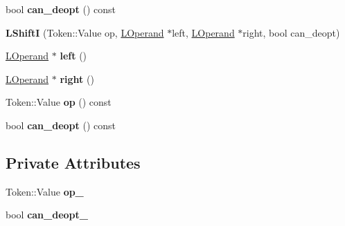 \begin{DoxyCompactItemize}
\item 
bool {\bfseries can\+\_\+deopt} () const \hypertarget{classv8_1_1internal_1_1_l_shift_i_abbbf228b7c1516e1e419ef9ffbcc97b6}{}\label{classv8_1_1internal_1_1_l_shift_i_abbbf228b7c1516e1e419ef9ffbcc97b6}

\item 
{\bfseries L\+ShiftI} (Token\+::\+Value op, \hyperlink{classv8_1_1internal_1_1_l_operand}{L\+Operand} $\ast$left, \hyperlink{classv8_1_1internal_1_1_l_operand}{L\+Operand} $\ast$right, bool can\+\_\+deopt)\hypertarget{classv8_1_1internal_1_1_l_shift_i_adaac229c54d2a924ac68d595fc30703a}{}\label{classv8_1_1internal_1_1_l_shift_i_adaac229c54d2a924ac68d595fc30703a}

\item 
\hyperlink{classv8_1_1internal_1_1_l_operand}{L\+Operand} $\ast$ {\bfseries left} ()\hypertarget{classv8_1_1internal_1_1_l_shift_i_a5ef728d134ab0ae5565b90793364add0}{}\label{classv8_1_1internal_1_1_l_shift_i_a5ef728d134ab0ae5565b90793364add0}

\item 
\hyperlink{classv8_1_1internal_1_1_l_operand}{L\+Operand} $\ast$ {\bfseries right} ()\hypertarget{classv8_1_1internal_1_1_l_shift_i_a728880e17b20375b612e631dcc13dc3e}{}\label{classv8_1_1internal_1_1_l_shift_i_a728880e17b20375b612e631dcc13dc3e}

\item 
Token\+::\+Value {\bfseries op} () const \hypertarget{classv8_1_1internal_1_1_l_shift_i_af3e3cecd04a31cf7df5a66653f6c009d}{}\label{classv8_1_1internal_1_1_l_shift_i_af3e3cecd04a31cf7df5a66653f6c009d}

\item 
bool {\bfseries can\+\_\+deopt} () const \hypertarget{classv8_1_1internal_1_1_l_shift_i_abbbf228b7c1516e1e419ef9ffbcc97b6}{}\label{classv8_1_1internal_1_1_l_shift_i_abbbf228b7c1516e1e419ef9ffbcc97b6}

\end{DoxyCompactItemize}
\subsection*{Private Attributes}
\begin{DoxyCompactItemize}
\item 
Token\+::\+Value {\bfseries op\+\_\+}\hypertarget{classv8_1_1internal_1_1_l_shift_i_a08d2ca0989fb1f8ae2aba380da73bee3}{}\label{classv8_1_1internal_1_1_l_shift_i_a08d2ca0989fb1f8ae2aba380da73bee3}

\item 
bool {\bfseries can\+\_\+deopt\+\_\+}\hypertarget{classv8_1_1internal_1_1_l_shift_i_a0d53dbbc8710aeb23713d448b5ac10de}{}\label{classv8_1_1internal_1_1_l_shift_i_a0d53dbbc8710aeb23713d448b5ac10de}

\end{DoxyCompactItemize}
